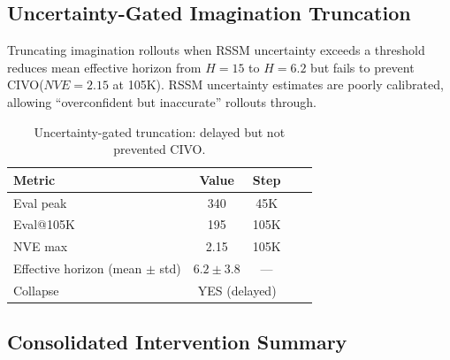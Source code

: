 \documentclass[letterpaper]{article}
\newcommand{\civo}{CIVO\xspace}
\newcommand{\nve}{NVE\xspace}
\begin{document}
\subsection{Uncertainty-Gated Imagination Truncation}

Truncating imagination rollouts when RSSM uncertainty exceeds a threshold reduces mean effective horizon from $H = 15$ to $H = 6.2$ but fails to prevent \civo ($\nve = 2.15$ at 105K). RSSM uncertainty estimates are poorly calibrated, allowing ``overconfident but inaccurate'' rollouts through.

\begin{table}[h]
\centering
\caption{Uncertainty-gated truncation: delayed but not prevented CIVO.}
\label{tab:uncertainty_truncation}
\begin{tabular}{lcccc}
\toprule
Metric & Value & Step \\
\midrule
Eval peak & 340 & 45K \\
Eval@105K & 195 & 105K \\
NVE max & 2.15 & 105K \\
Effective horizon (mean $\pm$ std) & $6.2 \pm 3.8$ & --- \\
Collapse & \multicolumn{2}{c}{YES (delayed)} \\
\bottomrule
\end{tabular}
\end{table}

\subsection{Consolidated Intervention Summary}
\end{document}
